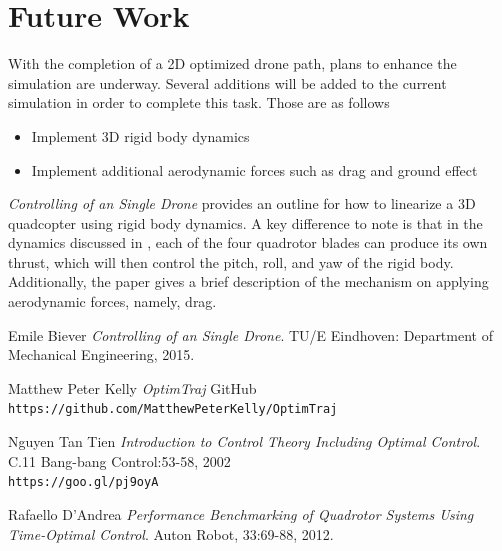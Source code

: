 \documentclass[12pt]{article}
\begin{document}
\clearpage
\section{Future Work}
With the completion of a 2D optimized drone path, plans to enhance the simulation are underway. Several additions will be added to the current simulation in order to complete this task. Those are as follows 
\newline
\begin{itemize}
  \item Implement 3D rigid body dynamics
  \item Implement additional aerodynamic forces such as drag and ground effect
\end{itemize}
\textit{Controlling of an Single Drone}\cite{Controlling of an Single Drone} provides an outline for how to linearize a 3D quadcopter using rigid body dynamics. A key difference to note is that in the dynamics discussed in \cite{Controlling of an Single Drone}, each of the four quadrotor blades can produce its own thrust, which will then control the pitch, roll, and yaw of the rigid body. Additionally, the paper gives a brief description of the mechanism on applying aerodynamic forces, namely, drag.


\clearpage



\begin{thebibliography}{9}


Emile Biever
\textit{Controlling of an Single Drone}.
TU/E Eindhoven: Department of Mechanical Engineering, 2015.



Matthew Peter Kelly
\textit{OptimTraj}
GitHub
\\\texttt{https://github.com/MatthewPeterKelly/OptimTraj}


Nguyen Tan Tien
\textit{Introduction to Control Theory Including Optimal Control}.
C.11 Bang-bang Control:53-58, 2002
\\\texttt{https://goo.gl/pj9oyA}



Rafaello D'Andrea
\textit{Performance Benchmarking of Quadrotor Systems Using Time-Optimal Control}.
Auton Robot, 33:69-88, 2012.






\end{thebibliography}


\end{document}
